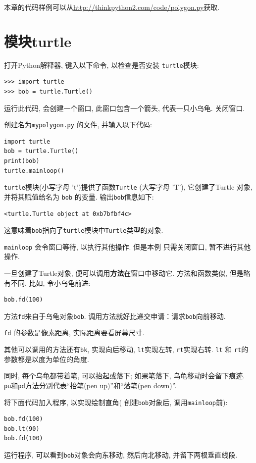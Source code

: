 \documentclass[10pt]{book}
\begin{document}
本章的代码样例可以从\url{http://thinkpython2.com/code/polygon.py}获取. 


\section{模块turtle}
\label{turtle}

打开Python解释器, 键入以下命令, 以检查是否安装 {\tt turtle}模块:

\begin{verbatim}
>>> import turtle
>>> bob = turtle.Turtle()
\end{verbatim}

运行此代码, 会创建一个窗口, 此窗口包含一个箭头, 代表一只小乌龟. 
关闭窗口. 

创建名为{\tt mypolygon.py} 的文件, 并输入以下代码:

\begin{verbatim}
import turtle
bob = turtle.Turtle()
print(bob)
turtle.mainloop()
\end{verbatim}
%
 {\tt turtle}模块(小写字母 't')提供了函数{\tt Turtle} (大写字母 'T'), 
它创建了Turtle 对象, 并将其赋值给名为 {\tt bob} 的变量. 
输出{\tt bob}信息如下:

\begin{verbatim}
<turtle.Turtle object at 0xb7bfbf4c>
\end{verbatim}
%
这意味着{\tt bob}指向了{\tt turtle}模块中{\tt Turtle}类型的对象.

\verb"mainloop" 会令窗口等待, 以执行其他操作. 但是本例
只需关闭窗口, 暂不进行其他操作. 

一旦创建了Turtle对象, 便可以调用{\bf 方法}在窗口中移动它. 
方法和函数类似, 但是略有不同. 比如, 令小乌龟前进:

\begin{verbatim}
bob.fd(100)
\end{verbatim}
%
方法{\tt fd}来自于乌龟对象{\tt bob}. 
调用方法就好比递交申请：请求{\tt bob}向前移动. 

{\tt fd} 的参数是像素距离, 实际距离要看屏幕尺寸. 

其他可以调用的方法还有{\tt bk}, 实现向后移动, 
{\tt lt}实现左转, {\tt rt}实现右转. 
{\tt lt} 和 {\tt rt}的参数都是以度为单位的角度. 

同时, 每个乌龟都带着笔, 可以抬起或落下;
如果笔落下, 乌龟移动时会留下痕迹. 
{\tt pu}和{\tt pd}方法分别代表``抬笔(pen up)''和``落笔(pen down)''.

将下面代码加入程序, 以实现绘制直角(
创建{\tt bob}对象后, 调用\verb"mainloop"前):

\begin{verbatim}
bob.fd(100)
bob.lt(90)
bob.fd(100)
\end{verbatim}
%
运行程序, 可以看到{\tt bob}对象会向东移动, 然后向北移动, 并留下两根垂直线段. 
\end{document}
